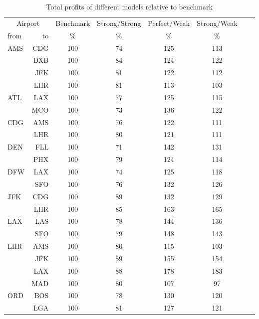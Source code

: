 \begin{table}[h]
    \begin{center}
        \small
        \begin{tabular}{l r c c c c c c}
            \toprule
            \multicolumn{2}{c}{Airport}  & Benchmark &  Strong/Strong  &  Perfect/Weak  &  Strong/Weak  \\[.4ex]
            from  &  to  &  \%  & \%  &  \%  & \%   \\
            \midrule
AMS  &  CDG &    100  &     74  &    125  &    113  \\
     &  DXB &    100  &     84  &    124  &    122  \\
     &  JFK &    100  &     81  &    122  &    112  \\
     &  LHR &    100  &     81  &    113  &    103  \\[.5ex]
ATL  &  LAX &    100  &     77  &    125  &    115  \\
     &  MCO &    100  &     73  &    136  &    122  \\[.5ex]
CDG  &  AMS &    100  &     76  &    122  &    111  \\
     &  LHR &    100  &     80  &    121  &    111  \\[.5ex]
DEN  &  FLL &    100  &     71  &    142  &    131  \\
     &  PHX &    100  &     79  &    124  &    114  \\[.5ex]
DFW  &  LAX &    100  &     74  &    125  &    118  \\
     &  SFO &    100  &     76  &    132  &    126  \\[.5ex]
JFK  &  CDG &    100  &     89  &    132  &    129  \\
     &  LHR &    100  &     85  &    163  &    165  \\[.5ex]
LAX  &  LAS &    100  &     78  &    144  &    136  \\
     &  SFO &    100  &     79  &    148  &    143  \\[.5ex]
LHR  &  AMS &    100  &     80  &    115  &    103  \\
     &  JFK &    100  &     89  &    155  &    154  \\
     &  LAX &    100  &     88  &    178  &    183  \\
     &  MAD &    100  &     80  &    107  &     97  \\[.5ex]
ORD  &  BOS &    100  &     78  &    130  &    120  \\
     &  LGA &    100  &     81  &    127  &    121  \\
            \bottomrule
        \end{tabular}
        \caption{Total profits of different models relative to benchmark}
        \label{tbl:resultsRelativeBenchmark}
    \end{center}
\end{table}


